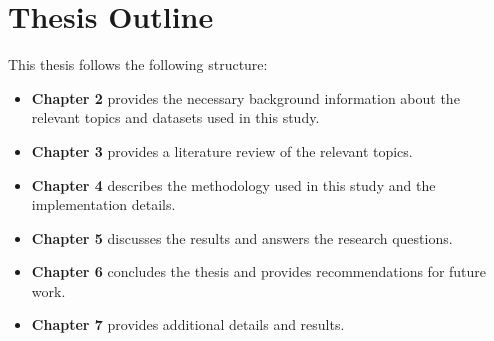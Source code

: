 \section{Thesis Outline}
This thesis follows the following structure:
\begin{itemize}
    \item \textbf{Chapter 2} provides the necessary background information about the relevant topics and datasets used in this study.
    \item \textbf{Chapter 3} provides a literature review of the relevant topics.
    \item \textbf{Chapter 4} describes the methodology used in this study and the implementation details.
    \item \textbf{Chapter 5} discusses the results and answers the research questions.
    \item \textbf{Chapter 6} concludes the thesis and provides recommendations for future work.
    \item \textbf{Chapter 7} provides additional details and results.
\end{itemize}